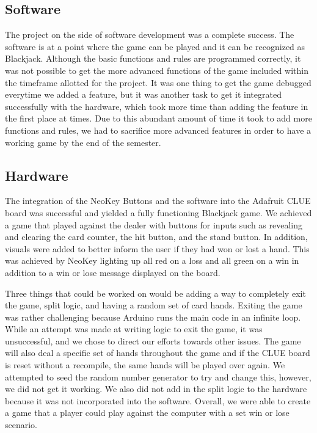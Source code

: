 \documentclass[12pt]{article}
\begin{document}
\subsection{Software}
The project on the side of software development was a complete success. The software is at a point where the game can be played and it can be recognized as Blackjack. Although the basic functions and rules are programmed correctly, it was not possible to get the more advanced functions of the game included within the timeframe allotted for the project. It was one thing to get the game debugged everytime we added a feature, but it was another task to get it integrated successfully with the hardware, which took more time than adding the feature in the first place at times. Due to this abundant amount of time it took to add more functions and rules, we had to sacrifice more advanced features in order to have a working game by the end of the semester.

\subsection{Hardware}
The integration of the NeoKey Buttons and the software into the Adafruit CLUE board was successful and yielded a fully functioning Blackjack game. We achieved a game that played against the dealer with buttons for inputs such as revealing and clearing the card counter, the hit button, and the stand button. In addition, visuals were added to better inform the user if they had won or lost a hand. This was achieved by NeoKey lighting up all red on a loss and all green on a win in addition to a win or lose message displayed on the board. 

Three things that could be worked on would be adding a way to completely exit the game, split logic, and having a random set of card hands. Exiting the game was rather challenging because Arduino runs the main code in an infinite loop. While an attempt was made at writing logic to exit the game, it was unsuccessful, and we chose to direct our efforts towards other issues. The game will also deal a specific set of hands throughout the game and if the CLUE board is reset without a recompile, the same hands will be played over again. We attempted to seed the random number generator to try and change this, however, we did not get it working. We also did not add in the split logic to the hardware because it was not incorporated into the software. Overall, we were able to create a game that a player could play against the computer with a set win or lose scenario.
\end{document}
